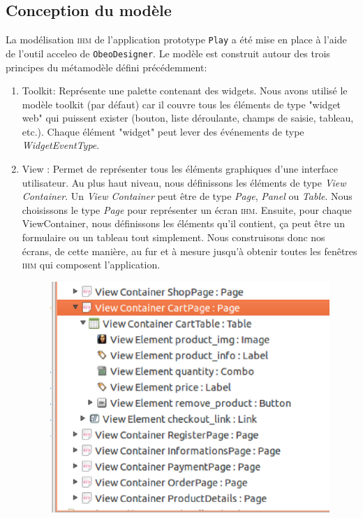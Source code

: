 \subsection{Conception du modèle}
La modélisation \textsc{ihm} de l'application prototype \texttt{Play} a été mise en place à l'aide de l'outil acceleo de \texttt{ObeoDesigner}. Le modèle est construit autour des trois principes du métamodèle défini précédemment:
\begin{enumerate}
\item Toolkit: Représente une palette contenant des widgets. Nous avons utilisé le modèle toolkit (par défaut) car il couvre tous les éléments de type "widget web" qui puissent exister (bouton, liste déroulante, champs de saisie, tableau, etc.). Chaque élément "widget" peut lever des événements de type \textit{WidgetEventType}.
\item View : Permet de représenter tous les éléments graphiques d'une interface utilisateur. Au plus haut niveau, nous définissons les éléments de type \textit{View Container}. 
\newline
Un \textit{View Container} peut être de type \textit{Page}, \textit{Panel} ou \textit{Table}. 
\newline
Nous choisissons le type \textit{Page} pour représenter un écran \textsc{ihm}. Ensuite, pour chaque ViewContainer, nous définissons les éléments qu'il contient, ça peut être un formulaire ou un tableau tout simplement. Nous construisons donc nos écrans, de cette manière, au fur et à mesure jusqu'à obtenir toutes les fenêtres \textsc{ihm} qui composent l'application.
\begin{figure}[H]
  \centering
  \includegraphics[scale=.4]{img/views.eps}

\end{figure}
\end{enumerate}

